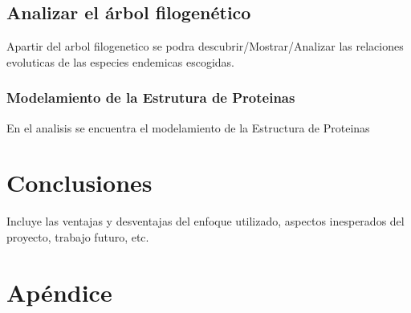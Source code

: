 \documentclass[a4paper]{article}
\begin{document}
\subsection{Analizar el árbol filogenético}
Apartir del arbol filogenetico se podra descubrir/Mostrar/Analizar las relaciones evoluticas de las especies endemicas escogidas.
\subsubsection{Modelamiento de la Estrutura de Proteinas}
En el analisis se encuentra el modelamiento de la Estructura de Proteinas

\section{Conclusiones}
Incluye las ventajas y desventajas del enfoque utilizado, aspectos inesperados del proyecto, trabajo futuro, etc.
\section{Apéndice}
\end{document}
